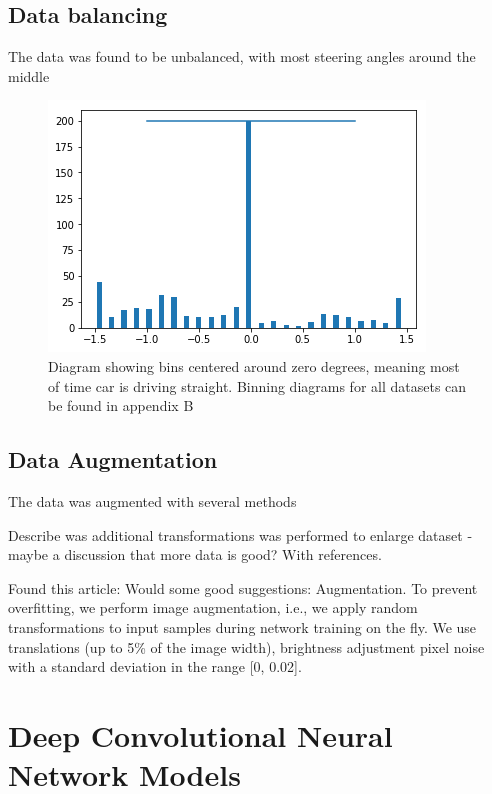 \subsection{Data balancing}

The data was found to be unbalanced, with most steering angles around the middle
\begin{figure}[ht]
 \centering 
 \includegraphics[scale=1]{Figures/bins.png}
 \caption{Diagram showing bins centered around zero degrees, meaning most of time car is driving straight. Binning diagrams for all datasets can be found in appendix B}
 \label{fig:bins-placeholder}
\end{figure}

\subsection{Data Augmentation}
The data was augmented with several methods

Describe was additional transformations was performed to enlarge dataset - maybe a discussion that more data is good? With references.


Found this article:
Would some good suggestions:  
Augmentation. To prevent overfitting, we perform image augmentation, i.e., we
apply random transformations to input samples during network training on the
fly. We use translations (up to 5\% of the image width), brightness adjustment
pixel noise with a standard deviation in the range [0, 0.02].
  
\section{Deep Convolutional Neural Network Models}

